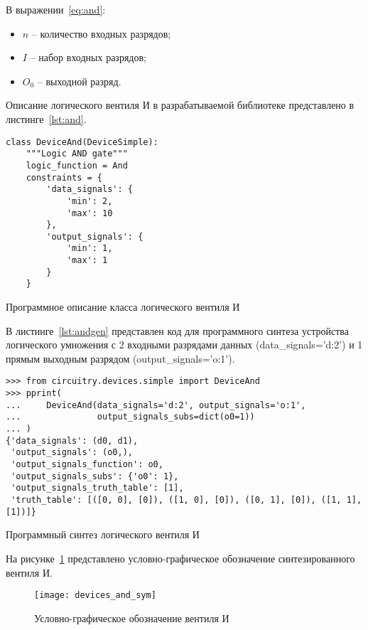 \documentclass[document.tex]{subfiles}
\begin{document}
В выражении~\ref{eq:and}:
\begin{itemize}[noitemsep]
  \item $n$ -- количество входных разрядов;
  \item $I$ -- набор входных разрядов;
  \item $O_0$ -- выходной разряд.
\end{itemize}

Описание логического вентиля И в разрабатываемой библиотеке представлено в
листинге~\ref{lst:and}.

\begin{listing}[ht]
\begin{verbatim}
class DeviceAnd(DeviceSimple):
    """Logic AND gate"""
    logic_function = And
    constraints = {
        'data_signals': {
            'min': 2,
            'max': 10
        },
        'output_signals': {
            'min': 1,
            'max': 1
        }
    }
\end{verbatim}
\caption{Программное описание класса логического вентиля И}
\label{lst:and}
\end{listing}

\clearpage
В листинге~\ref{lst:andgen} представлен код для программного синтеза
устройства логического умножения с 2 входными разрядами данных
(data\_signals='d:2') и 1 прямым выходным разрядом (output\_signals='o:1').

\begin{listing}[ht]
\begin{verbatim}
>>> from circuitry.devices.simple import DeviceAnd
>>> pprint(                                                                                
...     DeviceAnd(data_signals='d:2', output_signals='o:1',
...               output_signals_subs=dict(o0=1))
... )
{'data_signals': (d0, d1),
 'output_signals': (o0,),
 'output_signals_function': o0,
 'output_signals_subs': {'o0': 1},
 'output_signals_truth_table': [1],
 'truth_table': [([0, 0], [0]), ([1, 0], [0]), ([0, 1], [0]), ([1, 1], [1])]}
\end{verbatim}
\caption{Программный синтез логического вентиля И}
\label{lst:andgen}
\end{listing}

На рисунке~\ref{fig:deviceand} представлено условно-графическое обозначение
синтезированного вентиля И.

\begin{figure}[here]
\centering
\texttt{[image: devices\_and\_sym]}
\caption{Условно-графическое обозначение вентиля И}
\label{fig:deviceand}
\end{figure}
\end{document}
